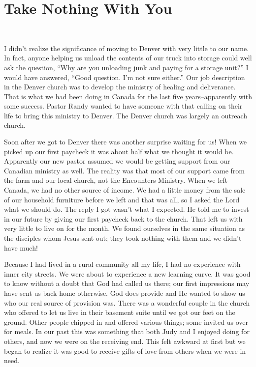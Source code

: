 \documentclass[twoside, 12pt]{book}
\begin{document}
\section{Take Nothing With You}
\

I didn’t realize the significance of moving to Denver with very little to our name. In fact, anyone helping us unload the contents of our truck into storage could well ask the question, “Why are you unloading junk and paying for a storage unit?” I would have answered, “Good question. I’m not sure either.” Our job description in the Denver church was to develop the ministry of healing and deliverance. That is what we had been doing in Canada for the last five years--apparently with some success. Pastor Randy wanted to have someone with that calling on their life to bring this ministry to Denver. The Denver church was largely an outreach church.

Soon after we got to Denver there was another surprise waiting for us! When we picked up our first paycheck it was about half what we thought it would be. Apparently our new pastor assumed we would be getting support from our Canadian ministry as well. The reality was that most of our support came from the farm and our local church, not the Encounters Ministry. When we left Canada, we had no other source of income. We had a little money from the sale of our household furniture before we left and that was all, so I asked the Lord what we should do. The reply I got wasn’t what I expected. He told me to invest in our future by giving our first paycheck back to the church. That left us with very little to live on for the month. We found ourselves in the same situation as the disciples whom Jesus sent out; they took nothing with them and we didn’t have much!


Because I had lived in a rural community all my life, I had no experience with inner city streets.  We were about to experience a new learning curve. It was good to know without a doubt that God had called us there; our first impressions may have sent us back home otherwise. God does provide and He wanted to show us who our real source of provision was. There was a wonderful couple in the church who offered to let us live in their basement suite until we got our feet on the ground. Other people chipped in and offered various things; some invited us over for meals. In our past this was something that both Judy and I enjoyed doing for others, and now we were on the receiving end. This felt awkward at first but we began to realize it was good to receive gifts of love from others when we were in need. 
\end{document}
